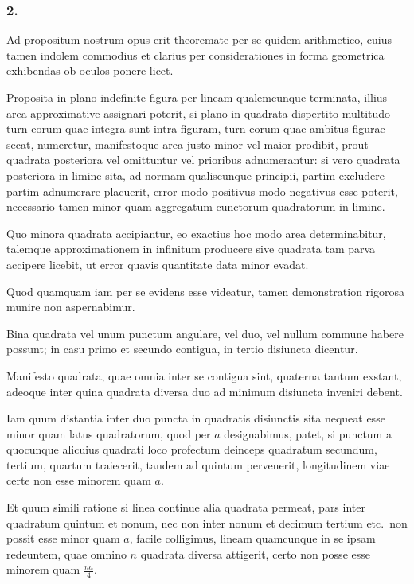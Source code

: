 \documentclass[12pt,a4paper]{article}
\begin{document}
\subsubsection*{2.}

Ad propositum nostrum opus erit theoremate per se quidem arithmetico, cuius tamen indolem commodius et clarius per considerationes in forma geometrica exhibendas ob oculos ponere licet.

Proposita in plano indefinite figura per lineam qualemcunque terminata, illius area approximative assignari poterit, si plano in quadrata dispertito multitudo turn eorum quae integra sunt intra figuram, turn eorum quae ambitus figurae secat, numeretur, manifestoque area justo minor vel maior prodibit, prout quadrata posteriora vel omittuntur vel prioribus adnumerantur: si vero quadrata posteriora in limine sita, ad normam qualiscunque principii, partim excludere partim adnumerare placuerit, error modo positivus modo negativus esse poterit, necessario tamen minor quam aggregatum cunctorum quadratorum in limine.

Quo minora quadrata accipiantur, eo exactius hoc modo area determinabitur, talemque approximationem in infinitum producere sive quadrata tam parva accipere licebit, ut error quavis quantitate data minor evadat.

Quod quamquam iam per se evidens esse videatur, tamen demonstration rigorosa munire non aspernabimur.

Bina quadrata vel unum punctum angulare, vel duo, vel nullum commune habere possunt; in casu primo et secundo contigua, in tertio disiuncta dicentur.

Manifesto quadrata, quae omnia inter se contigua sint, quaterna tantum exstant, adeoque inter quina quadrata diversa duo ad minimum disiuncta inveniri debent.

Iam quum distantia inter duo puncta in quadratis disiunctis sita nequeat esse minor quam latus quadratorum, quod per $a$ designabimus, patet, si punctum a quocunque alicuius quadrati loco profectum deinceps quadratum secundum, tertium, quartum traiecerit, tandem ad quintum pervenerit, longitudinem viae certe non esse minorem quam $a$.

Et quum simili ratione si linea continue alia quadrata permeat, pars inter quadratum quintum et nonum, nec non inter nonum et decimum tertium etc.\ non possit esse minor quam $a$, facile colligimus, lineam quamcunque in se ipsam redeuntem, quae omnino $n$ quadrata diversa attigerit, certo non posse esse minorem quam $\frac{na}{4}$.
\end{document}
